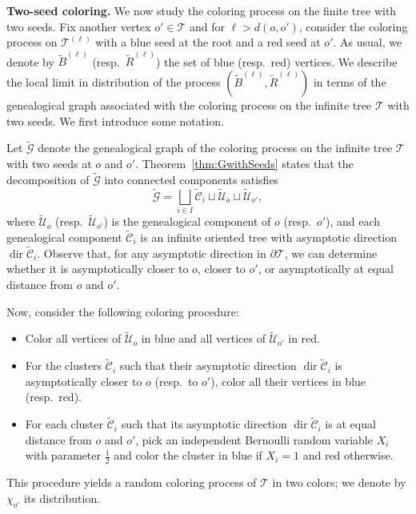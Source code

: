 \documentclass[french]{article}
\newcommand{\T}{\mathcal{T}}
\renewcommand{\dir}{\mathop{dir}}
\renewcommand{\1}{\mathds{1}}
\begin{document}
\bigskip 


\noindent\textbf{Two-seed coloring.} We now study the coloring process on the finite tree with two seeds. Fix another vertex $o' \in \T$ and for $\ell > d(o,o')$, consider the coloring process on $\T^{(\ell)}$ with a blue seed at the root and a red seed at $o'$. As usual, we denote by $\tilde{B}^{(\ell)}$ (resp.\ $\tilde{R}^{(\ell)}$) the set of blue (resp.\ red) vertices.
We describe the local limit in distribution of the process $(\tilde{B}^{(\ell)},\tilde{R}^{(\ell)})$ in terms of the genealogical graph associated with the coloring process on the infinite tree $\T$ with two seeds. We first introduce some notation.

\medskip

Let $\tilde{\mathcal G}$ denote the genealogical graph of the coloring process on the infinite tree $\T$ with two seeds at $o$ and $o'$. Theorem~\ref{thm:GwithSeeds} states that the decomposition of $\tilde{\mathcal G}$ into connected components satisfies
$$
\tilde{\mathcal G}
=
\bigsqcup_{i \in I} \tilde{\mathcal C}_i
\sqcup
\tilde{\mathcal U}_o
\sqcup
\tilde{\mathcal U}_{o'},
$$
where $\tilde{\mathcal U}_o$ (resp.\ $\tilde{\mathcal U}_{o'}$) is the genealogical component of $o$ (resp.\ $o'$), and each genealogical component $\tilde{\mathcal C}_i$ is an infinite oriented tree with asymptotic direction $\dir \tilde{\mathcal C}_i$. Observe that, for any asymptotic direction in $\partial \T$, we can determine whether it is asymptotically closer 
to $o$, closer to $o'$, or asymptotically at equal distance from $o$ and $o'$.

\medskip

\noindent Now, consider the following coloring procedure:
\begin{itemize}
    \item Color all vertices of $\tilde{\mathcal U}_o$ in blue and all vertices of $\tilde{\mathcal U}_{o'}$ in red.
    
    \item For the clusters $\tilde{\mathcal C}_i$ such that their asymptotic direction $\dir \tilde{\mathcal C}_i$ is asymptotically closer to $o$ (resp.\ to $o'$), color all their vertices in blue (resp.\ red).
    
    \item For each cluster $\tilde{\mathcal C}_i$ such that its asymptotic direction $\dir \tilde{\mathcal C}_i$ is at equal distance from $o$ and $o'$, pick an independent Bernoulli random variable $X_i$ with parameter $\frac{1}{2}$ and color the cluster in blue if $X_i=1$ and red otherwise.
\end{itemize}
This procedure yields a random coloring process of $\T$ in two colors; we denote by $\chi_{o'}$ its distribution.
\end{document}
